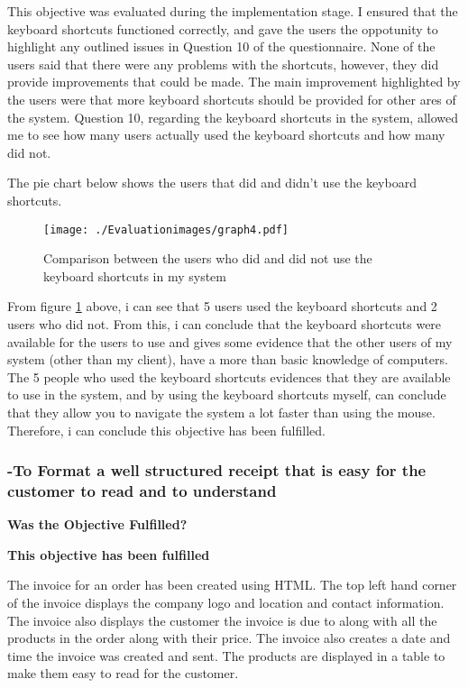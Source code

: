 This objective was evaluated during the implementation stage. I ensured that the keyboard shortcuts functioned correctly, and gave the users the oppotunity to highlight any outlined issues in Question 10 of the questionnaire. None of the users said that there were any problems with the shortcuts, however, they did provide improvements that could be made. The main improvement highlighted by the users were that more keyboard shortcuts should be provided for other ares of the system. Question 10, regarding the keyboard shortcuts in the system, allowed me to see how many users actually used the keyboard shortcuts and how many did not.

The pie chart below shows the users that did and didn't use the keyboard shortcuts.

\begin{figure}[H]
\caption{Comparison between the users who did and did not use the keyboard shortcuts in my system} \label{graph4}
\hfill\texttt{[image: ./Evaluationimages/graph4.pdf]}
\end{figure}

From figure \ref{graph4} above, i can see that 5 users used the keyboard shortcuts and 2 users who did not. From this, i can conclude that the keyboard shortcuts were available for the users to use and gives some evidence that the other users of my system (other than my client), have a more than basic knowledge of computers. The 5 people who used the keyboard shortcuts evidences that they are available to use in the system, and by using the keyboard shortcuts myself, can conclude that they allow you to navigate the system a lot faster than using the mouse. Therefore, i can conclude this objective has been fulfilled.


\pagebreak
\subsubsection{-To Format a well structured receipt that is easy for the customer to read and to understand}
\textbf{Was the Objective Fulfilled?} \newline

\textbf{\large{This objective has been fulfilled}}

The invoice for an order has been created using HTML. The top left hand corner of the invoice displays the company logo and location and contact information. The invoice also displays the customer the invoice is due to along with all the products in the order along with their price. The invoice also creates a date and time the invoice was created and sent. The products are displayed in a table to make them easy to read for the customer.

